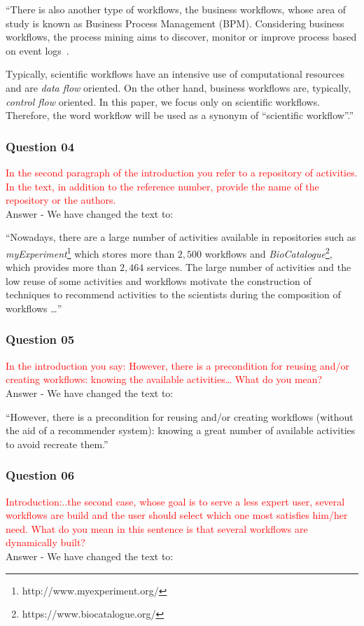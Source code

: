 \documentclass{report}
\begin{document}
``There is also another type of workflows, the business workflows, whose area of study is known as Business Process Management (BPM). Considering business workflows, the process mining aims to discover, monitor or improve process based on event logs~\cite{Aalst2011}. 

Typically, scientific workflows have an intensive use of computational resources and are \emph{data flow} oriented. On the other hand, business workflows are, typically, \emph{control flow} oriented. In this paper, we focus only on scientific workflows. Therefore, the word workflow will be used as a synonym of ``scientific workflow''.''

\subsubsection{Question 04}
\textcolor{red}{In the second paragraph of the introduction you refer to a repository of activities. In the text, in addition to the  reference number, provide the name of the repository or the authors.}
\\
Answer -  We have changed the text to:
 
``Nowadays, there are a large number of activities available in repositories such as \emph{myExperiment}\footnote{http://www.myexperiment.org/} which stores more than $2,500$ workflows and \emph{BioCatalogue}\footnote{https://www.biocatalogue.org/}, which provides more than $2,464$ services. The large number of activities and the low reuse of some activities and workflows motivate the construction of techniques to recommend activities to the scientists during the composition of workflows \ldots ''
	
\subsubsection{Question 05}
\textcolor{red}{In the introduction you say:  However, there is a precondition for reusing and/or creating workflows: knowing the available activities… What do you mean?}
\\
Answer -  We have changed the text to:

``However, there is a precondition for reusing and/or creating workflows (without the aid of a recommender system): knowing a great number of available activities to avoid recreate them.''


\subsubsection{Question 06}
\textcolor{red}{Introduction:..the second case, whose goal is to serve a less expert user,
	several workflows are build and the user should select which one most
	satisfies him/her need. What do you mean in this sentence is that several
	workflows are dynamically built?}
\\
Answer -  We have changed the text to:
\end{document}
